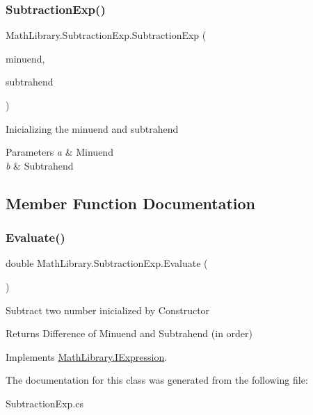 \subsubsection{\texorpdfstring{SubtractionExp()}{SubtractionExp()}}
{\footnotesize\ttfamily Math\+Library.\+Subtraction\+Exp.\+Subtraction\+Exp (\begin{DoxyParamCaption}\item[{\mbox{\hyperlink{interface_math_library_1_1_i_expression}{I\+Expression}}}]{minuend,  }\item[{\mbox{\hyperlink{interface_math_library_1_1_i_expression}{I\+Expression}}}]{subtrahend }\end{DoxyParamCaption})\hspace{0.3cm}{\ttfamily [inline]}}



Inicializing the minuend and subtrahend 


\begin{DoxyParams}{Parameters}
{\em a} & Minuend\\
\hline
{\em b} & Subtrahend\\
\hline
\end{DoxyParams}


\subsection{Member Function Documentation}
\mbox{\label{class_math_library_1_1_subtraction_exp_a768d12e100448596101ce525813609bf}} 
\subsubsection{\texorpdfstring{Evaluate()}{Evaluate()}}
{\footnotesize\ttfamily double Math\+Library.\+Subtraction\+Exp.\+Evaluate (\begin{DoxyParamCaption}{ }\end{DoxyParamCaption})\hspace{0.3cm}{\ttfamily [inline]}}



Subtract two number inicialized by Constructor 

\begin{DoxyReturn}{Returns}
Difference of Minuend and Subtrahend (in order)
\end{DoxyReturn}


Implements \mbox{\hyperlink{interface_math_library_1_1_i_expression}{Math\+Library.\+I\+Expression}}.



The documentation for this class was generated from the following file\+:\begin{DoxyCompactItemize}
\item 
Subtraction\+Exp.\+cs\end{DoxyCompactItemize}
